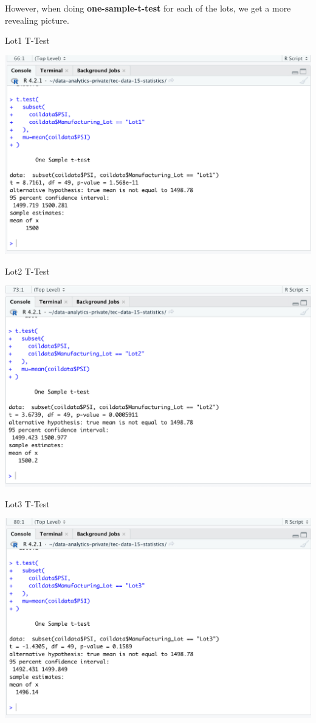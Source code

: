 \documentclass[11pt]{article}
\begin{document}
However, when doing \textbf{one-sample-t-test} for each of the lots, we get a more revealing picture.

Lot1 T-Test

\begin{center}
\includegraphics[width=.9\linewidth]{./resources/_r_3b.png}
\end{center}

Lot2 T-Test

\begin{center}
\includegraphics[width=.9\linewidth]{./resources/_r_3c.png}
\end{center}

Lot3 T-Test

\begin{center}
\includegraphics[width=.9\linewidth]{./resources/_r_3d.png}
\end{center}
\end{document}
